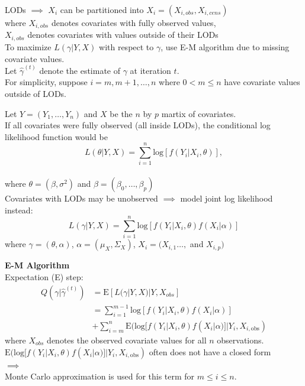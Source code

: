 \documentclass[xcolor=dvipsnames]{beamer}
\begin{document}
\begin{frame}
LODs $\implies$ $X_i$ can be partitioned into $X_i=(X_{i,obs}, X_{i,cens})$\\
where $X_{i,obs}$ denotes covariates with fully observed values,\\
$X_{i,obs}$ denotes covariates with values outside of their LODs\\
\vspace{0.5cm}
To maximize $L(\gamma | Y, X)$ with respect to $\gamma$, use E-M algorithm due to missing covariate values.\\
\vspace{0.5cm}
Let $\hat{\gamma}^{(t)}$ denote the estimate of $\gamma$ at iteration $t$.\\
For simplicity, suppose $i=m, m+1, \dots, n$ where $0<m \le n$ have covariate values outside of LODs. 
\end{frame}

\begin{frame}
Let $Y=(Y_1, \ldots, Y_n)$ and $X$ be the $n$ by $p$ martix of covariates.\\
If all covariates were fully observed (all inside LODs), the conditional log likelihood function would be\\
$$L(\theta | Y, X) = \sum_{i=1}^n \textrm{log}[f(Y_i | X_i, \theta)],$$\\ where $\theta = (\beta, \sigma^2)$ and $\beta=(\beta_0, \dots, \beta_p)$\\
\vspace{0.5cm}
Covariates with LODs may be unobserved $\implies$ model joint log likelihood instead:\\
$$L(\gamma | Y, X) = \sum_{i=1}^n \textrm{log}[f(Y_i | X_i, \theta) f(X_i | \alpha)]$$ where $\gamma=(\theta, \alpha)$, $\alpha=(\mu_X, \Sigma_X)$, $X_i=(X_{i,1} \ldots,$ and $X_{i,p})$
\end{frame}

\begin{frame}
\textbf{E-M Algorithm}\\
Expectation (E) step:
\begin{align*}
Q(\gamma | \hat{\gamma}^{(t)})&=\textrm{E}[L(\gamma | Y, X)|Y, X_{obs}] \\
 &= \sum_{i=1}^{m-1}\textrm{log}[f(Y_i | X_i, \theta) f(X_i | \alpha)] \\
 &+ \sum_{i=m}^n\textrm{E}(\textrm{log}[f(Y_i | X_i, \theta) f(X_i | \alpha)]|Y_i,X_{i, \textrm{obs}})
\end{align*}
where $X_{obs}$ denotes the observed covariate values for all $n$ observations.\\
\vspace{0.5cm}
$\textrm{E}(\textrm{log}[f(Y_i | X_i, \theta) f(X_i | \alpha)]|Y_i,X_{i, \textrm{obs}})$ often does not have a closed form \cite{may_2011}\\
$\implies$\\
Monte Carlo approximation is used for this term for $m \leq i \leq n$.
\end{frame}
\end{document}
